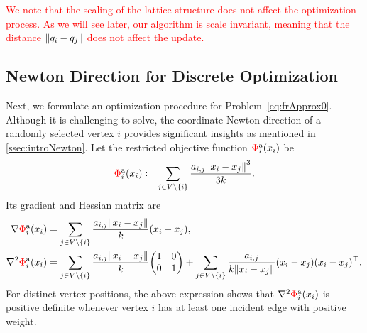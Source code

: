\documentclass[11pt]{article}
\newcommand{\red}[1]{\textcolor{red}{#1}}
\newcommand{\defeq}{\coloneqq}
\begin{document}
\red{
  We note that the scaling of the lattice structure does not affect the optimization process.
  As we will see later, our algorithm is scale invariant, meaning that the distance $\norm{q_{i}- q_{j}}$ does not affect the update.
}

\subsection{Newton Direction for Discrete Optimization}
\label{ssec:newtonDirection}

Next, we formulate an optimization procedure for Problem~\eqref{eq:frApprox0}.
Although it is challenging to solve, the coordinate Newton direction of a randomly selected vertex $i$ provides significant insights as mentioned in \cref{ssec:introNewton}.
Let the restricted objective function $\red{\Phi}^{\mathrm{a}}_{i}(x_{i})$ be
\begin{equation*}
  \red{\Phi}^{\mathrm{a}}_{i}(x_{i}) \defeq \sum_{j \in V \setminus \{i\}}\frac{a_{i,j}\norm{x_i - x_j}^{3}}{3k}.
\end{equation*}
Its gradient and Hessian matrix are
\begin{align*}
  \nabla \red{\Phi}^{\mathrm{a}}_{i}(x_{i})    & = \sum_{j \in V \setminus \{i\}}\frac{a_{i,j}\norm{x_i - x_j}}{k}(x_{i}- x_{j}),                             \\
  \nabla^{2}\red{\Phi}^{\mathrm{a}}_{i}(x_{i}) & = \sum_{j \in V \setminus \{i\}}\frac{a_{i,j}\norm{x_i - x_j}}{k}\mqty(1                                 & 0 \\
  0                                            & 1) + \sum_{j \in V \setminus \{i\}}\frac{a_{i,j}}{k\norm{x_i - x_j}}(x_{i}- x_{j})(x_{i}- x_{j})^{\top}.
\end{align*}
For distinct vertex positions, the above expression shows that $\nabla^{2}\red{\Phi}^{\mathrm{a}}_{i}(x_{i})$ is positive definite whenever vertex $i$ has at least one incident edge with positive weight.
\end{document}
